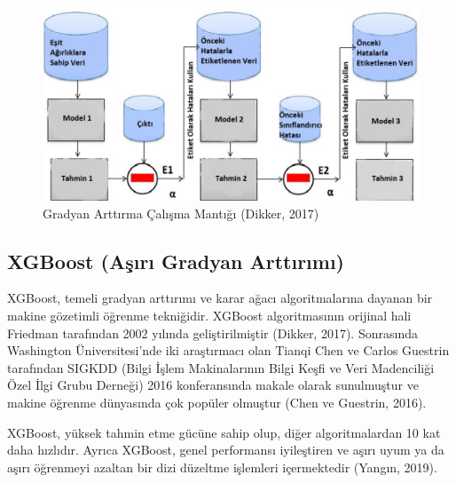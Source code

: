 \documentclass[12pt,twoside]{deuthesis}
\begin{document}
\begin{figure}

{\centering \includegraphics[width=1\linewidth,height=0.4\textheight]{figure/gb-dixit} 

}

\caption{Gradyan Arttırma Çalışma Mantığı (Dikker, 2017)}\label{fig:unnamed-chunk-8}
\end{figure}
\hypertarget{xgboost-aux15fux131rux131-gradyan-arttux131rux131mux131}{%
\subsection{XGBoost (Aşırı Gradyan Arttırımı)}\label{xgboost-aux15fux131rux131-gradyan-arttux131rux131mux131}}

XGBoost, temeli gradyan arttırımı ve karar ağacı algoritmalarına dayanan bir makine gözetimli öğrenme tekniğidir.
XGBoost algoritmasının orijinal hali Friedman tarafından 2002 yılında geliştirilmiştir (Dikker, 2017). Sonrasında Washington Üniversitesi'nde iki araştırmacı olan Tianqi Chen ve Carlos Guestrin tarafından SIGKDD (Bilgi İşlem Makinalarının Bilgi Keşfi ve Veri Madenciliği Özel İlgi Grubu Derneği) 2016 konferansında makale olarak sunulmuştur ve makine öğrenme dünyasında çok popüler olmuştur (Chen ve Guestrin, 2016).

XGBoost, yüksek tahmin etme gücüne sahip olup, diğer algoritmalardan 10 kat daha hızlıdır. Ayrıca XGBoost, genel performansı iyileştiren ve aşırı uyum ya da aşırı öğrenmeyi azaltan bir dizi düzeltme işlemleri içermektedir (Yangın, 2019).
\end{document}
